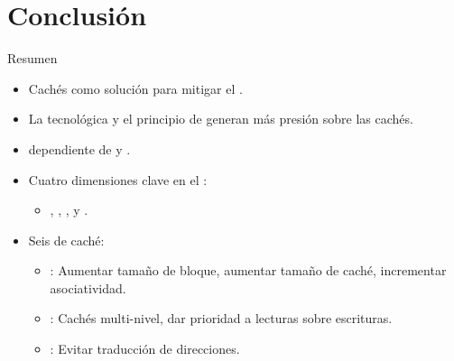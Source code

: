 \section{Conclusión}

\begin{frame}[t,shrink=10]{Resumen}
\begin{itemize}

  \item Cachés como solución para mitigar el .

  \item La  tecnológica y el principio de 
        generan más presión sobre las cachés.
  
  \item {} dependiente de 
        y .

  \item Cuatro dimensiones clave en el :
    \begin{itemize}
      \item 
        , 
        ,
        , y
        .
    \end{itemize}

  \item Seis  de caché:
    \begin{itemize}
      \item {}: 
        Aumentar tamaño de bloque,
        aumentar tamaño de caché,
        incrementar asociatividad.
      \item {}:
        Cachés multi-nivel,
        dar prioridad a lecturas sobre escrituras.
      \item {}:
        Evitar traducción de direcciones.
    \end{itemize}
\end{itemize}
\end{frame}


